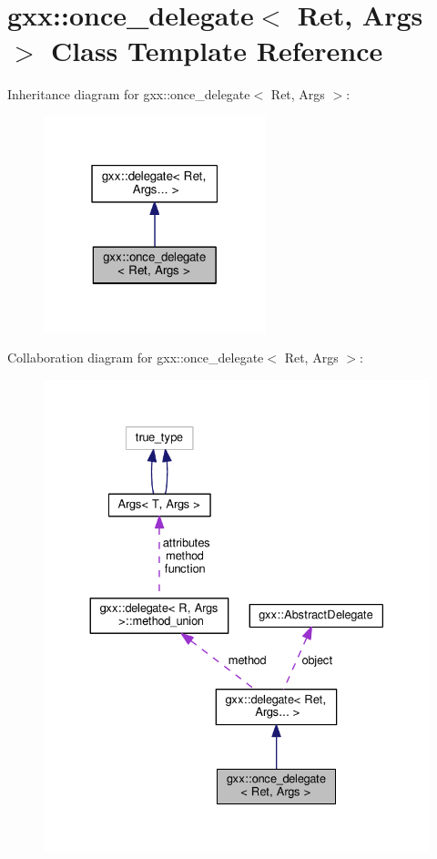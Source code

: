 \hypertarget{classgxx_1_1once__delegate}{}\section{gxx\+:\+:once\+\_\+delegate$<$ Ret, Args $>$ Class Template Reference}
\label{classgxx_1_1once__delegate}


Inheritance diagram for gxx\+:\+:once\+\_\+delegate$<$ Ret, Args $>$\+:
\nopagebreak
\begin{figure}[H]
\begin{center}
\leavevmode
\includegraphics[width=183pt]{classgxx_1_1once__delegate__inherit__graph}
\end{center}
\end{figure}


Collaboration diagram for gxx\+:\+:once\+\_\+delegate$<$ Ret, Args $>$\+:
\nopagebreak
\begin{figure}[H]
\begin{center}
\leavevmode
\includegraphics[width=330pt]{classgxx_1_1once__delegate__coll__graph}
\end{center}
\end{figure}
